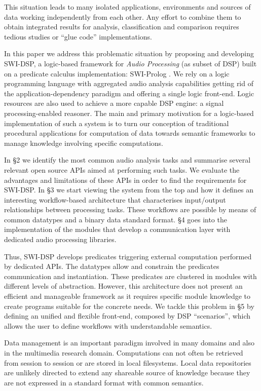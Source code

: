 \documentclass[runningheads]{llncs}
\begin{document}
This situation leads to many isolated applications, environments and sources of data working independently from each other. Any effort to combine them to obtain integrated results for analysis, classification and comparison requires tedious studies or ``glue code'' implementations.

In this paper we address this problematic situation by proposing and developing SWI-DSP, a logic-based framework for \textit{Audio Processing} (as subset of DSP) built on a predicate calculus implementation: SWI-Prolog \cite{swi}. We rely on a logic programming language with aggregated audio analysis capabilities getting rid of the application-dependency paradigm and offering a single logic front-end. Logic resources are also used to achieve a more capable DSP engine: a signal processing-enabled reasoner. The main and primary motivation for a logic-based implementation of such a system is to turn our conception of traditional procedural applications for computation of data towards semantic frameworks to manage knowledge involving specific computations.

In \S 2 we identify the most common audio analysis tasks and summarise several relevant open source APIs aimed at performing such tasks. We evaluate the advantages and limitations of these APIs in order to find the requirements for SWI-DSP. In \S 3 we start viewing the system from the top and how it defines an interesting workflow-based architecture that characterises input/output relationships between processing tasks. These workflows are possible by means of common datatypes and a binary data standard format. \S 4 goes into the implementation of the modules that develop a communication layer with dedicated audio processing libraries.

Thus, SWI-DSP develops predicates triggering external computation performed by dedicated APIs. The datatypes allow and constrain the predicates communication and instantiation. These predicates are clustered in modules with different levels of abstraction. However, this architecture does not present an efficient and manageable framework as it requires specific module knowledge to create programs suitable for the concrete needs. We tackle this problem in \S 5 by defining an unified and flexible front-end, composed by DSP ``scenarios'', which allows the user to define workflows with understandable semantics.

Data management is an important paradigm involved in many domains and also in the multimedia research domain. Computations can not often be retrieved from session to session or are stored in local filesystems. Local data repositories are unlikely directed to extend any shareable source of knowledge because they are not expressed in a standard format with common semantics.
\end{document}
